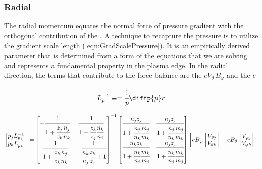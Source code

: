 \subsubsection{Radial} \label{subsub:MCRadial}
The radial momentum equates the normal force of pressure gradient with the orthogonal contribution of the \vxb. A technique to recapture the pressure is to utilize the gradient scale length (\cref{eqn:GradScalePressure}). It is an empirically derived parameter that is determined from a form of the equations that we are solving \cite{Stacey2004a} and represents a fundamental property in the plasma edge. In the radial direction, the \vxb terms that contribute to the force balance are the $e V_\theta \, B_\varphi$ and the $e$

\begin{equation}
	L_p^{-1} \equiv = \cfrac{1}{p} \diffp{p}r
	\label{eqn:GradScalePressure}
\end{equation}

\begin{equation}
	\begin{bmatrix}
		p_j L^{-1}_{p_j} \\
		p_k L^{-1}_{p_k}
	\end{bmatrix} =
	\begin{bmatrix}
		-\cfrac{1}{1+\cfrac{z_j}{z_k} \cfrac{n_j}{n_k}} & \cfrac{1}{1+\cfrac{z_k}{z_j} \cfrac{n_k}{n_j}} \\
		\cfrac{1}{1+\cfrac{z_k}{z_k} \cfrac{n_j}{n_k}} & -\cfrac{1}{\cfrac{n_k}{n_j} \cfrac{z_k}{z_j}+1}
	\end{bmatrix}^{-1} 
	\begin{bmatrix}
		\cfrac{n_j z_j}{1+\cfrac{n_j}{n_k} \cfrac{m_j}{m_k}} & \cfrac{n_j z_j}{1+\cfrac{n_j}{n_k} \cfrac{m_j}{m_k}} \\
		\cfrac{n_k z_k}{1+\cfrac{n_k}{n_j} \cfrac{m_k}{m_j}} & \cfrac{n_j z_j}{1+\cfrac{n_k}{n_j} \cfrac{m_k}{m_j}}
	\end{bmatrix} 
	\begin{bmatrix}
		e B_\varphi
		\begin{bmatrix}
			V_{\theta j} \\
			V_{\theta k}
		\end{bmatrix} -
		e B_\theta
		\begin{bmatrix}
			V_{\varphi j} \\
			V_{\varphi k}
		\end{bmatrix}
	\end{bmatrix}
	\label{eqn:ConservationOfMomentumRadial}
\end{equation} 


